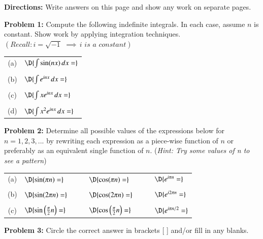 \documentclass[11pt]{article}
\begin{document}

{\bf Directions:} Write answers on this page and show any work on separate pages. 

\vspace{0.1cm}

{\bf Problem 1:} Compute the following indefinite integrals.  In each case, assume $n$ is constant.  Show work by applying integration techniques. $\left(Recall: i=\sqrt{-1}\,\, \implies \, i \,\, is \,\, a \,\, constant \right)$

\vspace{0.1cm}

\setlength{\extrarowheight}{0.1cm}
\begin{tabular}{cl}
	(a) & $\D{\int \sin (nx) \, dx = }$ \\
	\\
	(b) & $\D{\int e^{inx} \, dx = }$ \\
	\\
	(c) & $\D{\int xe^{inx} \, dx = }$ \\
	\\
	(d) & $\D{\int x^2 e^{inx} \, dx = }$ \\
\end{tabular}

\vspace{0.3cm}

{\bf Problem 2:} Determine all possible values of the expressions below for $n=1,2,3,...$ by rewriting each expression as a piece-wise function of $n$ or preferably as an equivalent single function of $n$.  ({\em Hint: Try some values of n to see a pattern})

\setlength{\extrarowheight}{0.2cm}
\begin{tabular}{clp{2.1cm}clp{2.1cm}cl}
	(a) & $\D{\sin (\pi n) = }$ & &
	    & $\D{\cos (\pi n) = }$ & &
	    & $\D{e^{i\pi n} = }$ \\
	\\
	(b) & $\D{\sin (2\pi n) = }$ & &
	    & $\D{\cos (2\pi n) = }$ & &
	    & $\D{e^{i2\pi n} = }$ \\
	\\
	(c) & $\D{\sin \left(\frac{\pi}{2}n\right)  = }$ & &
	    & $\D{\cos \left(\frac{\pi}{2}n\right) = }$ & &
	    & $\D{e^{i\pi n/2} = }$ \\
\end{tabular}

\vspace{0.4cm}

{\bf Problem 3:} Circle the correct answer in brackets [ ] and/or fill in any blanks.
\end{document}
